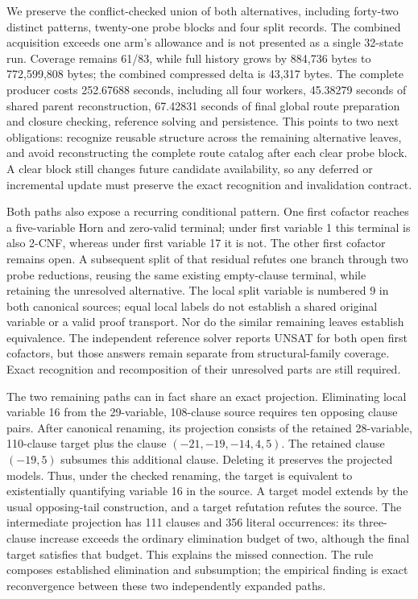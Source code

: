 \documentclass[11pt,a4paper]{article}
\numberwithin{equation}{section}
\theoremstyle{plain}
\theoremstyle{definition}
\theoremstyle{remark}
\begin{document}
We preserve the conflict-checked union of both alternatives, including forty-two distinct patterns, twenty-one probe blocks and four split records. The combined acquisition exceeds one arm's allowance and is not presented as a single 32-state run. Coverage remains 61/83, while full history grows by 884,736 bytes to 772,599,808 bytes; the combined compressed delta is 43,317 bytes. The complete producer costs 252.67688 seconds, including all four workers, 45.38279 seconds of shared parent reconstruction, 67.42831 seconds of final global route preparation and closure checking, reference solving and persistence. This points to two next obligations: recognize reusable structure across the remaining alternative leaves, and avoid reconstructing the complete route catalog after each clear probe block. A clear block still changes future candidate availability, so any deferred or incremental update must preserve the exact recognition and invalidation contract.

Both paths also expose a recurring conditional pattern. One first cofactor reaches a five-variable Horn and zero-valid terminal; under first variable 1 this terminal is also 2-CNF, whereas under first variable 17 it is not. The other first cofactor remains open. A subsequent split of that residual refutes one branch through two probe reductions, reusing the same existing empty-clause terminal, while retaining the unresolved alternative. The local split variable is numbered 9 in both canonical sources; equal local labels do not establish a shared original variable or a valid proof transport. Nor do the similar remaining leaves establish equivalence. The independent reference solver reports UNSAT for both open first cofactors, but those answers remain separate from structural-family coverage. Exact recognition and recomposition of their unresolved parts are still required.

The two remaining paths can in fact share an exact projection. Eliminating local variable 16 from the 29-variable, 108-clause source requires ten opposing clause pairs. After canonical renaming, its projection consists of the retained 28-variable, 110-clause target plus the clause $(-21,-19,-14,4,5)$. The retained clause $(-19,5)$ subsumes this additional clause. Deleting it preserves the projected models. Thus, under the checked renaming, the target is equivalent to existentially quantifying variable 16 in the source. A target model extends by the usual opposing-tail construction, and a target refutation refutes the source. The intermediate projection has 111 clauses and 356 literal occurrences: its three-clause increase exceeds the ordinary elimination budget of two, although the final target satisfies that budget. This explains the missed connection. The rule composes established elimination and subsumption; the empirical finding is exact reconvergence between these two independently expanded paths.
\end{document}
